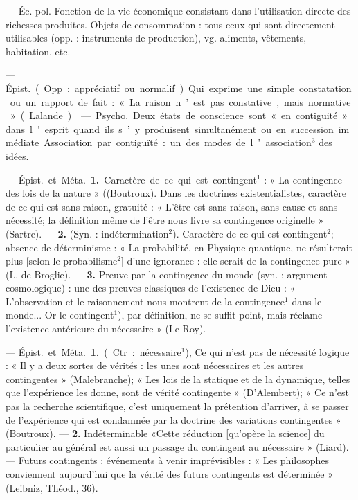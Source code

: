 \begin{itemize}[leftmargin=1cm, label=, itemsep=11pt]
 — Éc. pol. Fonction
de la vie économique consistant
dans l'utilisation directe des richesses produites. Objets de consommation : tous ceux qui sont directement utilisables (opp. : instruments
de production), vg. aliments, vêtements, habitation, etc.

 — \si{Épist.} (Opp. : appréciatif
ou normalif). Qui exprime une
simple constatation ou un rapport
de fait : « La raison n’est pas constative, mais normative » (Lalande).

 — \si{Psycho.} Deux états de
conscience sont « en contiguité »
dans l'esprit quand ils s’y produisent simultanément ou en succession
immédiate. Association par contiguïté : un des modes de l’association$^3$ des idées.

 — \si{Épist.} et \si{Méta.} {\bf 1.} Caractère de ce qui est contingent$^1$ :
« La contingence des lois de la
nature » ((Boutroux). Dans les doctrines existentialistes, caractère de
ce qui est sans raison, gratuité :
« L’être est sans raison, sans cause et
sans nécessité; la définition même
de l’être nous livre sa contingence
originelle » (Sartre). —  {\bf 2.} (Syn. :
indétermination$^2$). Caractère de ce
qui est contingent$^2$; absence de déterminisme : « La probabilité, en
Physique quantique, ne résulterait
plus [selon le probabilisme$^2$] d’une
ignorance : elle serait de la contingence pure » (L. de Broglie). —  {\bf 3.}
Preuve par la contingence du monde
(syn. : argument cosmologique) : une
des preuves classiques de l’existence de Dieu : « L'observation et
le raisonnement nous montrent de
la contingence$^1$ dans le monde... Or
le contingent$^1$), par définition, ne se
suffit point, mais réclame l’existence antérieure du nécessaire » (Le
Roy).

 — \si{Épist.} et \si{Méta.} {\bf 1.} (Ctr. :
nécessaire$^1$), Ce qui n'est pas de nécessité logique : « Il y a deux sortes
de vérités : les unes sont nécessaires
et les autres contingentes » (Malebranche); « Les lois de la statique
et de la dynamique, telles que l’expérience les donne, sont de vérité
contingente » (D’Alembert); « Ce
n’est pas la recherche scientifique,
c’est uniquement la prétention d’arriver, à se passer de l'expérience qui
est condamnée par la doctrine des
variations contingentes »  (Boutroux). —  {\bf 2.} Indéterminable
«Cette réduction [qu’opère la science]
du particulier au général est aussi
un passage du contingent au nécessaire » (Liard). — Futurs contingents : événements à venir imprévisibles : « Les philosophes conviennent aujourd'hui que la vérité des
futurs contingents est déterminée »
(Leibniz, Théod., 36).


\end{itemize}
